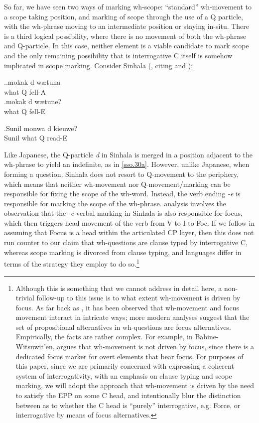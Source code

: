 \documentclass{glossa}
\begin{document}
So far, we have seen two ways of marking wh-scope: ``standard'' wh-movement to a scope taking position, and marking of scope through the use of a Q particle, with the wh-phrase moving to an intermediate position or staying in-situ. There is a third logical possibility, where there is no movement of both the wh-phrase and Q-particle. In this case, neither element is a viable candidate to mark scope and the only remaining possibility that is interrogative C itself is somehow implicated in scope marking. Consider Sinhala (\cite{slade:2011}, citing \cite{gair-sumangala:1991} and \cite{hagstrom:1998}):

\ex.\ag.\label{sso.30a}mokak d{\textschwa} w{\ae}tuna\\
   what Q fell-A\\
   \bg.\label{sso.30b}mokak d{\textschwa} w{\ae}tune?\\
   what Q fell-E\\

\exg.\label{sso.31}Sunil mon{\textschwa}wa d{\textschwa} kieuwe?\\
   Sunil what Q read-E\\

Like Japanese, the Q-particle \textit{d\textschwa} in Sinhala is merged in a position adjacent to the wh-phrase to yield an indefinite, as in \ref{sso.30a}. However, unlike Japanese, when forming a question, Sinhala does not resort to Q-movement to the periphery, which means that neither wh-movement nor Q-movement/marking can be responsible for fixing the scope of the wh-word. Instead, the verb ending \textit{-e} is responsible for marking the scope of the wh-phrase. \cite{slade:2011} analysis involves the observation that the \textit{-e} verbal marking in Sinhala is also responsible for focus, which then triggers head movement of the verb from V to I to Foc. If we follow \cite{rizzi:1997} in assuming that Focus is a head within the articulated CP layer, then this does not run counter to our claim that wh-questions are clause typed by interrogative C, whereas scope marking is divorced from clause typing, and languages differ in terms of the strategy they employ to do so.\footnote{Although this is something that we cannot address in detail here, a non-trivial follow-up to this issue is to what extent wh-movement is driven by focus. As far back as \cite{huang:1982}, it has been observed that wh-movement and focus movement interact in intricate ways; more modern analyses \citep{beck:2006} suggest that the set of propositional alternatives in wh-questions are focus alternatives. Empirically, the facts are rather complex. For example, in Babine-Witsuwit'en, \cite{denham:2000} argues that wh-movement is not driven by focus, since there is a dedicated focus marker for overt elements that bear focus. For purposes of this paper, since we are primarily concerned with expressing a coherent system of interrogativity, with an emphasis on clause typing and scope marking, we will adopt the approach that wh-movement is driven by the need to satisfy the EPP on some C head, and intentionally blur the distinction between as to whether the C head is ``purely'' interrogative, e.g. Force, or interrogative by means of focus alternatives.}
\end{document}
